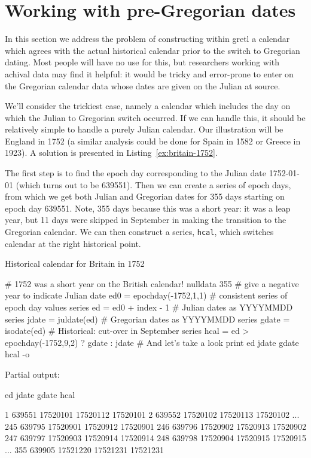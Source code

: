 \section{Working with pre-Gregorian dates}
\label{sec:cal-conversion}

In this section we address the problem of constructing within gretl a
calendar which agrees with the actual historical calendar prior to
the switch to Gregorian dating. Most people will have no use for
this, but researchers working with achival data may find it helpful:
it would be tricky and error-prone to enter on the Gregorian calendar
data whose dates are given on the Julian at source.

We'll consider the trickiest case, namely a calendar which includes
the day on which the Julian to Gregorian switch occurred. If we can
handle this, it should be relatively simple to handle a purely Julian
calendar. Our illustration will be England in 1752 (a similar analysis
could be done for Spain in 1582 or Greece in 1923). A solution
is presented in Listing~\ref{ex:britain-1752}.

The first step is to find the epoch day corresponding to the Julian
date 1752-01-01 (which turns out to be 639551). Then we can create a
series of epoch days, from which we get both Julian and Gregorian
dates for 355 days starting on epoch day 639551. Note, 355 days
because this was a short year: it was a leap year, but 11 days were
skipped in September in making the transition to the Gregorian
calendar. We can then construct a series, \texttt{hcal}, which
switches calendar at the right historical point.

\begin{script}[htbp]
  \caption{Historical calendar for Britain in 1752}
  \label{ex:britain-1752}
\begin{scodebit}
# 1752 was a short year on the British calendar!
nulldata 355
# give a negative year to indicate Julian date
ed0 = epochday(-1752,1,1)
# consistent series of epoch day values
series ed = ed0 + index - 1
# Julian dates as YYYYMMDD
series jdate = juldate(ed)
# Gregorian dates as YYYYMMDD
series gdate = isodate(ed)
# Historical: cut-over in September
series hcal = ed > epochday(-1752,9,2) ? gdate : jdate
# And let's take a look
print ed jdate gdate hcal -o
\end{scodebit}
Partial output:
\begin{scodebit}
              ed        jdate        gdate         hcal

  1       639551     17520101     17520112     17520101
  2       639552     17520102     17520113     17520102
...
245       639795     17520901     17520912     17520901
246       639796     17520902     17520913     17520902
247       639797     17520903     17520914     17520914
248       639798     17520904     17520915     17520915
...
355       639905     17521220     17521231     17521231
\end{scodebit}
\end{script}

